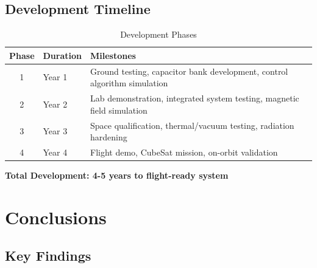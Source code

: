 \documentclass[11pt,a4paper]{article}
\begin{document}
\subsection{Development Timeline}

\begin{table}[h!]
\centering
\caption{Development Phases}
\begin{tabular}{clp{8cm}}
\toprule
\textbf{Phase} & \textbf{Duration} & \textbf{Milestones} \\
\midrule
1 & Year 1 & Ground testing, capacitor bank development, control algorithm simulation \\
2 & Year 2 & Lab demonstration, integrated system testing, magnetic field simulation \\
3 & Year 3 & Space qualification, thermal/vacuum testing, radiation hardening \\
4 & Year 4 & Flight demo, CubeSat mission, on-orbit validation \\
\bottomrule
\end{tabular}
\end{table}

\textbf{Total Development: 4-5 years to flight-ready system}

\section{Conclusions}

\subsection{Key Findings}
\end{document}
